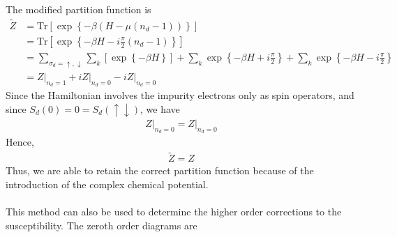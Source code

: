 \documentclass[twoside]{report}
\numberwithin{equation}{section}
\begin{document}
The modified partition function is
\begin{equation}\begin{aligned}
	\widetilde Z &= \text{Tr}\left[\exp\left\{-\beta \left(H -  \mu(n_d-1)\right)\right\}\right]\\
	      &=\text{Tr}\left[\exp\left\{-\beta H - i\frac{\pi}{2}(n_d -1)\right\}\right]\\
	      &=\sum_{\sigma_d = \uparrow,\downarrow}\sum_{k}\left[\exp\left\{-\beta H\right\}\right] + \sum_{k}\exp\left\{-\beta H + i\frac{\pi}{2}\right\} + \sum_{k}\exp\left\{-\beta H - i\frac{\pi}{2}\right\}\\
         &= Z\bigg\vert_{n_d = 1} + i Z\bigg\vert_{n_d = 0} - i Z\bigg\vert_{n_d = 0}
\end{aligned}\end{equation}
Since the Hamiltonian involves the impurity electrons only as spin operators, and since \(S_d(0) = 0 = S_d(\uparrow\downarrow)\), we have 
\begin{equation}\begin{aligned}
Z\bigg\vert_{n_d = 0} = Z\bigg\vert_{n_d = 0}
\end{aligned}\end{equation}
Hence,
\begin{equation}\begin{aligned}
\widetilde Z = Z
\end{aligned}\end{equation}
Thus, we are able to retain the correct partition function because of the introduction of the complex chemical potential.\\\\
This method can also be used to determine the higher order corrections to the susceptibility.
The zeroth order diagrams are\\\\
\end{document}
